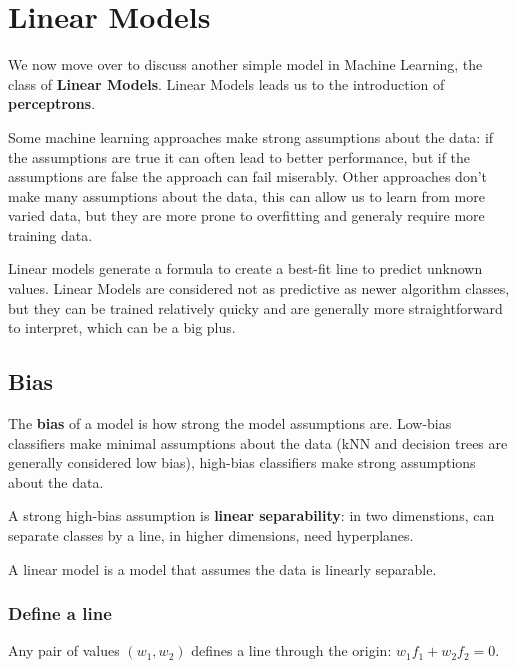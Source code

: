 \chapter{Linear Models}

We now move over to discuss another simple model in Machine Learning, the class of \textbf{Linear Models}. Linear Models leads us to the introduction of \textbf{perceptrons}.

Some machine learning approaches make strong assumptions about the data: if the assumptions are true it can often lead to better performance, but if the assumptions are false the approach can fail miserably.
Other approaches don't make many assumptions about the data, this can allow us to learn from more varied data, but they are more prone to overfitting and generaly require more training data.

Linear models generate a formula to create a best-fit line to predict unknown values. Linear Models are considered not as predictive as newer algorithm classes, but they can be trained relatively quicky and are generally more straightforward to interpret, which can be a big plus.

\section{Bias}
The \textbf{bias} of a model is how strong the model assumptions are. Low-bias classifiers make minimal assumptions about the data (kNN and decision trees are generally considered low bias), high-bias classifiers make strong assumptions about the data.

A strong high-bias assumption is \textbf{linear separability}: in two dimenstions, can separate classes by a line, in higher dimensions, need hyperplanes.

A linear model is a model that assumes the data is linearly separable.

\subsection{Define a line}
Any pair of values \((w_1,w_2)\) defines a line through the origin: \(w_1f_1 + w_2f_2 = 0\).

